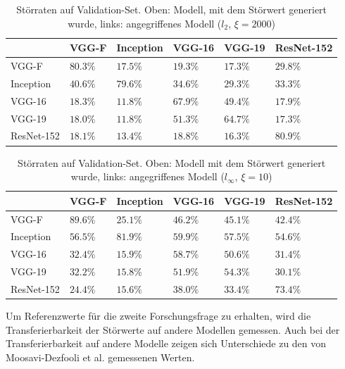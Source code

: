 \documentclass{FFHS_Thesis_Additions/ffhsthesis}
\begin{document}
\begin{table}[]
\centering
\caption{Störraten auf Validation-Set. Oben: Modell, mit dem Störwert generiert wurde, links: angegriffenes Modell ($l_2$, $\xi=2000$)}
\begin{tabular}{|l|l|l|l|l|l|}
\hline

			& VGG-F		&	Inception	&	VGG-16		&	VGG-19		&	ResNet-152	\\ \hline
VGG-F		& $80.3\%$	&	$17.5\%$		&	$19.3\%$		&	$17.3\%$		& 	$29.8\%$	\\
Inception	& $40.6\%$	&	$79.6\%$		&	$34.6\%$		&	$29.3\%$		& 	$33.3\%$	\\
VGG-16		& $18.3\%$	&	$11.8\%$		&	$67.9\%$		&	$49.4\%$		& 	$17.9\%$	\\
VGG-19		& $18.0\%$	&	$11.8\%$		&	$51.3\%$		&	$64.7\%$		& 	$17.3\%$	\\
ResNet-152	& $18.1\%$	&	$13.4\%$		&	$18.8\%$		&	$16.3\%$		& 	$80.9\%$	\\

\hline 
\end{tabular}
\label{tbl_stoerraten_reprod_kreuz_l2}
\end{table}

\begin{table}[]
\centering
\caption{Störraten auf Validation-Set. Oben: Modell mit dem Störwert generiert wurde, links: angegriffenes Modell ($l_\infty$, $\xi=10$)}
\begin{tabular}{|l|l|l|l|l|l|}
\hline

			& VGG-F		&	Inception		&	VGG-16		&	VGG-19			&	ResNet-152	\\ \hline
VGG-F		& $89.6\%$	&	$25.1\%$		&	$46.2\%$	&	$45.1\%$			& 	$42.4\%$		\\
Inception	& $56.5\%$	&	$81.9\%$		&	$59.9\%$	&	$57.5\%$		& 	$54.6\%$	\\
VGG-16		& $32.4\%$	&	$15.9\%$		&	$58.7\%$	&	$50.6\%$		& 	$31.4\%$	\\
VGG-19		& $32.2\%$	&	$15.8\%$		&	$51.9\%$	&	$54.3\%$		& 	$30.1\%$	\\
ResNet-152	& $24.4\%$	&	$15.6\%$		&	$38.0\%$	&	$33.4\%$		& 	$73.4\%$	\\

\hline 
\end{tabular}
\label{tbl_stoerraten_reprod_kreuz_linf}
\end{table}

Um Referenzwerte für die zweite Forschungsfrage zu erhalten, wird die Transferierbarkeit der Störwerte auf andere Modellen gemessen. 
Auch bei der Transferierbarkeit auf andere Modelle zeigen sich Unterschiede zu den von Moosavi-Dezfooli et al. gemessenen Werten.
\end{document}
